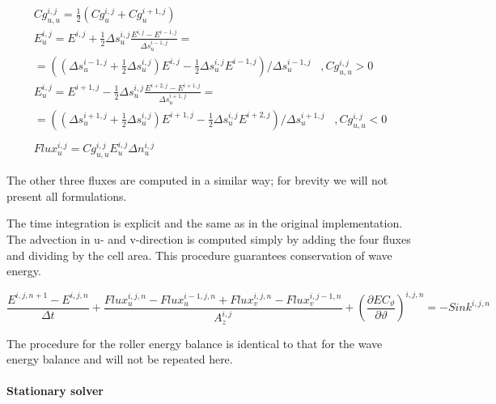 \documentclass{article}
\begin{document}
\noindent 
\begin{equation} \label{ZEqnNum633932} 
\begin{array}{l} {Cg_{u,u}^{i,j} =\frac{1}{2} (Cg_{u}^{i,j} +Cg_{u}^{i+1,j} )} \\ {E_{u}^{i,j} =E^{i,j} +\frac{1}{2} \Delta s_{u}^{i,j} \frac{E^{i,j} -E^{i-1,j} }{\Delta s_{u}^{i-1,j} } =} \\ {=\left(\left(\Delta s_{u}^{i-1,j} +\frac{1}{2} \Delta s_{u}^{i,j} \right)E^{i,j} -\frac{1}{2} \Delta s_{u}^{i,j} E^{i-1,j} \right)/\Delta s_{u}^{i-1,j} \, \, \, \, \, ,Cg_{u,u}^{i,j} >0} \\ {E_{u}^{i,j} =E^{i+1,j} -\frac{1}{2} \Delta s_{u}^{i,j} \frac{E^{i+2,j} -E^{i+1,j} }{\Delta s_{u}^{i+1,j} } =} \\ {=\left(\left(\Delta s_{u}^{i+1,j} +\frac{1}{2} \Delta s_{u}^{i,j} \right)E^{i+1,j} -\frac{1}{2} \Delta s_{u}^{i,j} E^{i+2,j} \right)/\Delta s_{u}^{i+1,j} \, \, \, \, \, ,Cg_{u,u}^{i,j} <0} \\ {} \\ {Flux_{u}^{i,j} =Cg_{u,u}^{i,j} E_{u}^{i,j} \Delta n_{u}^{i,j} } \end{array} 
\end{equation} 


\noindent The other three fluxes are computed in a similar way; for brevity we will not present all formulations.

\noindent 

\noindent The time integration is explicit and the same as in the original implementation. The advection in u- and v-direction is computed simply by adding the four fluxes and dividing by the cell area. This procedure guarantees conservation of wave energy.

\noindent 
\[\frac{E^{i,j,n+1} -E^{i,j,n} }{\Delta t} +\frac{Flux_{u}^{i,j,n} -Flux_{u}^{i-1,j,n} +Flux_{v}^{i,j,n} -Flux_{v}^{i,j-1,n} }{A_{z}^{i,j} } +\left(\frac{\partial EC_{\vartheta } }{\partial \vartheta } \right)^{i,j,n} =-Sink^{i,j,n} \] 

    \label{ZEqnNum723168}

\noindent The procedure for the roller energy balance is identical to that for the wave energy balance and will not be repeated here.

\noindent 


\paragraph{ Stationary solver}
\end{document}
